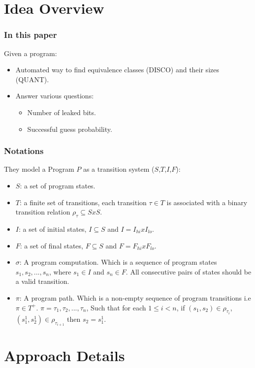 \documentclass{beamer}
\begin{document}
\section{Idea Overview}
\begin{frame}
\frametitle{In this paper}
Given a program:
\begin{itemize}
\item Automated way to find equivalence classes (DISCO) and their sizes (QUANT).
\item Answer various questions:
\begin{itemize}
\item Number of leaked bits.
\item Successful guess probability.
\end{itemize}
\end{itemize}
\end{frame}


\begin{frame}
\frametitle{Notations}
They model a Program $P$ as a transition system ($S$,$T$,$I$,$F$):
\begin{itemize}
\item $S$: a set of program states.
\item $T$: a finite set of transitions, each transition $\tau \in T$ is associated with a binary transition relation $\rho_{\tau} \subseteq S x S$.
\item $I$: a set of initial states, $I \subseteq S$ and $I = I_{hi} x I_{lo}$.
\item $F$: a set of final states, $F \subseteq S$ and $F = F_{hi} x F_{lo}$.
\item $\sigma$: A program computation. Which is a sequence of program states $s_{1},s_{2},...,s_{n}$, where $s_{1} \in I$ and $s_{n} \in F$. All consecutive pairs of states should be a valid transition.
\item $\pi$: A program path. Which is a non-empty sequence of program transitions i.e $\pi \in T^{+}$. $\pi = \tau_{1},\tau_{2},...,\tau_{n}$, Such that for each $1 \leq i < n$, if $(s_{1},s_{2}) \in \rho_{\tau_{i}}$, $(s_{1}^{1},s_{2}^{1}) \in \rho_{\tau_{i+1}}$ then $s_{2} = s_{1}^{1}$.
\end{itemize}
\end{frame}

\section{Approach Details}
\end{document}

